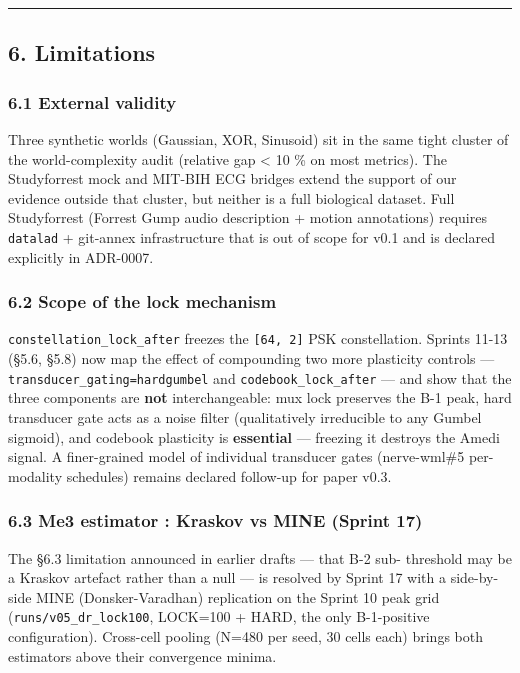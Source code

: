 \documentclass[
]{article}
\begin{document}
\begin{center}\rule{0.5\linewidth}{0.5pt}\end{center}

\subsection{6. Limitations}\label{6-limitations}

\subsubsection{6.1 External validity}\label{61-external-validity}

Three synthetic worlds (Gaussian, XOR, Sinusoid) sit in the same tight
cluster of the world-complexity audit (relative gap \textless{} 10 \% on
most metrics). The Studyforrest mock and MIT-BIH ECG bridges extend the
support of our evidence outside that cluster, but neither is a full
biological dataset. Full Studyforrest (Forrest Gump audio description +
motion annotations) requires \texttt{datalad} + git-annex infrastructure
that is out of scope for v0.1 and is declared explicitly in ADR-0007.

\subsubsection{6.2 Scope of the lock
mechanism}\label{62-scope-of-the-lock-mechanism}

\texttt{constellation\_lock\_after} freezes the \texttt{{[}64,\ 2{]}}
PSK constellation. Sprints 11-13 (§5.6, §5.8) now map the effect of
compounding two more plasticity controls ---
\texttt{transducer\_gating=hard\textbar{}gumbel} and
\texttt{codebook\_lock\_after} --- and show that the three components
are \textbf{not} interchangeable: mux lock preserves the B-1 peak, hard
transducer gate acts as a noise filter (qualitatively irreducible to any
Gumbel sigmoid), and codebook plasticity is \textbf{essential} ---
freezing it destroys the Amedi signal. A finer-grained model of
individual transducer gates (nerve-wml\#5 per-modality schedules)
remains declared follow-up for paper v0.3.

\subsubsection{6.3 Me3 estimator : Kraskov vs MINE (Sprint
17)}\label{63-me3-estimator--kraskov-vs-mine-sprint-17}

The §6.3 limitation announced in earlier drafts --- that B-2 sub-
threshold may be a Kraskov artefact rather than a null --- is resolved
by Sprint 17 with a side-by-side MINE (Donsker-Varadhan) replication on
the Sprint 10 peak grid (\texttt{runs/v05\_dr\_lock100}, LOCK=100 +
HARD, the only B-1-positive configuration). Cross-cell pooling (N=480
per seed, 30 cells each) brings both estimators above their convergence
minima.
\end{document}
